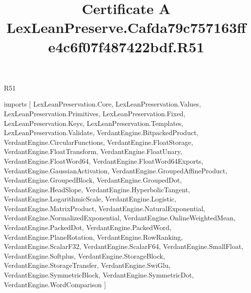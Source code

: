 \begin{lexlean}{R51}
\title{Certificate A LexLeanPreserve.Cafda79c757163ffe4c6f07f487422bdf.R51}
\begin{coremodule}
imports [
  LexLeanPreservation.Core,
  LexLeanPreservation.Values,
  LexLeanPreservation.Primitives,
  LexLeanPreservation.Fixed,
  LexLeanPreservation.Keys,
  LexLeanPreservation.Templates,
  LexLeanPreservation.Validate,
  VerdantEngine.BitpackedProduct,
  VerdantEngine.CircularFunctions,
  VerdantEngine.FloatStorage,
  VerdantEngine.FloatTransform,
  VerdantEngine.FloatUnary,
  VerdantEngine.FloatWord64,
  VerdantEngine.FloatWord64Exports,
  VerdantEngine.GaussianActivation,
  VerdantEngine.GroupedAffineProduct,
  VerdantEngine.GroupedBlock,
  VerdantEngine.GroupedDot,
  VerdantEngine.HeadSlope,
  VerdantEngine.HyperbolicTangent,
  VerdantEngine.LogarithmicScale,
  VerdantEngine.Logistic,
  VerdantEngine.MatrixProduct,
  VerdantEngine.NaturalExponential,
  VerdantEngine.NormalizedExponential,
  VerdantEngine.OnlineWeightedMean,
  VerdantEngine.PackedDot,
  VerdantEngine.PackedWord,
  VerdantEngine.PlaneRotation,
  VerdantEngine.RowRanking,
  VerdantEngine.ScalarF32,
  VerdantEngine.ScalarF64,
  VerdantEngine.SmallFloat,
  VerdantEngine.Softplus,
  VerdantEngine.StorageBlock,
  VerdantEngine.StorageTransfer,
  VerdantEngine.SwiGlu,
  VerdantEngine.SymmetricBlock,
  VerdantEngine.SymmetricDot,
  VerdantEngine.WordComparison
]


\end{coremodule}
\end{lexlean}
